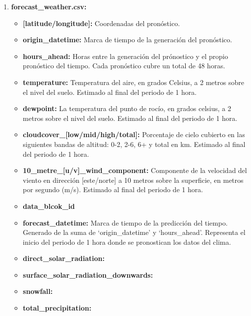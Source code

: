 \documentclass[a4paper,12pt]{article}
\begin{document}
\begin{enumerate}
    \item \textbf{forecast\_weather.csv:}
    \begin{itemize}
        \item \textbf{[latitude/longitude]:}
        Coordenadas del pronóstico.
        \item \textbf{origin\_datetime:}
        Marca de tiempo de la generación del 
        pronóstico.
        \item \textbf{hours\_ahead:}
        Horas entre la generación del prónostico 
        y el propio pronóstico del tiempo. Cada 
        pronóstico cubre un total de 48 horas.
        \item \textbf{temperature:}
        Temperatura del aire, en grados Celsius, 
        a 2 metros sobre el nivel del suelo. Estimado
        al final del periodo de 1 hora.
        \item \textbf{dewpoint:}
        La temperatura del punto de rocío, en 
        grados celsius, a 2 metros sobre el nivel del 
        suelo. Estimado al final del periodo de 1 hora.
        \item \textbf{cloudcover\_[low/mid/high/total]:}
        Porcentaje de cielo cubierto en las siguientes 
        bandas de altitud: 0-2, 2-6, 6+ y total en km.
        Estimado al final del periodo de 1 hora.
        \item \textbf{10\_metre\_[u/v]\_wind\_component:}
        Componente de la velocidad del viento en dirección
        [este/norte] a 10 metros sobre la superficie, en 
        metros por segundo (m/s).
        Estimado al final del periodo de 1 hora.
        \item \textbf{data\_blcok\_id}
        \item \textbf{forecast\_datetime:}
        Marca de tiempo de la predicción del tiempo.
        Generado de la suma de `origin\_datetime' y 
        `hours\_ahead'. Representa el inicio del periodo
        de 1 hora donde se pronostican los datos del clima.
        \item \textbf{direct\_solar\_radiation:}
        \item \textbf{surface\_solar\_radiation\_downwards:}
        \item \textbf{snowfall:}
        \item \textbf{total\_precipitation:}
    \end{itemize}


\end{enumerate}
\end{document}
